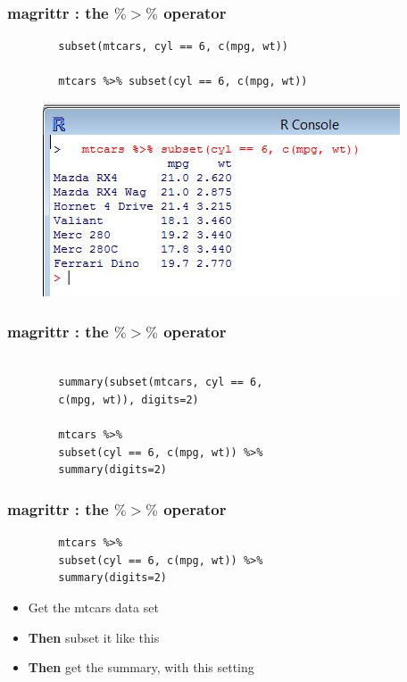 \documentclass{beamer}
\begin{document}
\begin{frame}[fragile]
	\frametitle{magrittr :  the $\%>\%$ operator}
	\Large
	\begin{framed}
		\begin{verbatim}
		subset(mtcars, cyl == 6, c(mpg, wt))
		
		mtcars %>% subset(cyl == 6, c(mpg, wt))
		\end{verbatim}
	\end{framed}
\end{frame}
\begin{frame}
	\begin{figure}
		\centering
		\includegraphics[width=0.99\linewidth]{images/magrittrcode01}
	\end{figure}
\end{frame}
\begin{frame}[fragile]
	\frametitle{magrittr :  the $\%>\%$ operator}
	\Large
	\begin{framed}
		\begin{verbatim}
		
		summary(subset(mtcars, cyl == 6, 
		c(mpg, wt)), digits=2)
		
		mtcars %>% 
		subset(cyl == 6, c(mpg, wt)) %>% 
		summary(digits=2)
		\end{verbatim}
	\end{framed}
	
\end{frame}
\begin{frame}[fragile]
	\frametitle{magrittr :  the $\%>\%$ operator}
	\Large
	\begin{framed}
		\begin{verbatim}	
		mtcars %>% 
		subset(cyl == 6, c(mpg, wt)) %>% 
		summary(digits=2)
		\end{verbatim}
	\end{framed}
	\begin{itemize}
		\item Get the mtcars data set
		\item \textbf{Then} subset it like this
		\item \textbf{Then} get the summary, with this setting
	\end{itemize}
\end{frame}
\end{document}
